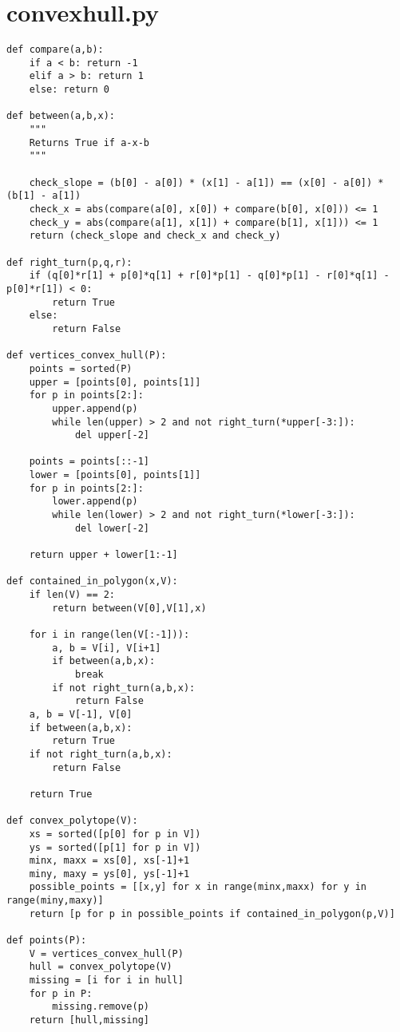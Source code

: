 \documentclass[12pt]{amsart}
\theoremstyle{plain}
\begin{document}
\section{convexhull.py}
\begin{verbatim}
def compare(a,b):
    if a < b: return -1
    elif a > b: return 1
    else: return 0

def between(a,b,x):
    """
    Returns True if a-x-b
    """

    check_slope = (b[0] - a[0]) * (x[1] - a[1]) == (x[0] - a[0]) * (b[1] - a[1])
    check_x = abs(compare(a[0], x[0]) + compare(b[0], x[0])) <= 1
    check_y = abs(compare(a[1], x[1]) + compare(b[1], x[1])) <= 1
    return (check_slope and check_x and check_y)

def right_turn(p,q,r):
    if (q[0]*r[1] + p[0]*q[1] + r[0]*p[1] - q[0]*p[1] - r[0]*q[1] - p[0]*r[1]) < 0:
        return True
    else:
        return False

def vertices_convex_hull(P):
    points = sorted(P)
    upper = [points[0], points[1]]
    for p in points[2:]:
        upper.append(p)
        while len(upper) > 2 and not right_turn(*upper[-3:]):
            del upper[-2]

    points = points[::-1]
    lower = [points[0], points[1]]
    for p in points[2:]:
        lower.append(p)
        while len(lower) > 2 and not right_turn(*lower[-3:]):
            del lower[-2]

    return upper + lower[1:-1]

def contained_in_polygon(x,V):
    if len(V) == 2:
        return between(V[0],V[1],x)

    for i in range(len(V[:-1])):
        a, b = V[i], V[i+1]
        if between(a,b,x):
            break
        if not right_turn(a,b,x):
            return False
    a, b = V[-1], V[0]
    if between(a,b,x):
        return True
    if not right_turn(a,b,x):
        return False

    return True

def convex_polytope(V):
    xs = sorted([p[0] for p in V])
    ys = sorted([p[1] for p in V])
    minx, maxx = xs[0], xs[-1]+1
    miny, maxy = ys[0], ys[-1]+1
    possible_points = [[x,y] for x in range(minx,maxx) for y in range(miny,maxy)]
    return [p for p in possible_points if contained_in_polygon(p,V)]

def points(P):
    V = vertices_convex_hull(P)
    hull = convex_polytope(V)
    missing = [i for i in hull]
    for p in P:
        missing.remove(p)
    return [hull,missing]
\end{verbatim}
\end{document}

